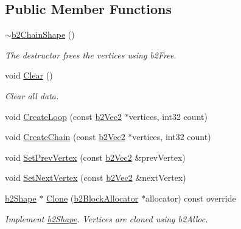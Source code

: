 \subsection*{Public Member Functions}
\begin{DoxyCompactItemize}
\item 
\mbox{\label{classb2_chain_shape_a8c032394f5a85e7fc425a437e7689a18}} 
\hyperlink{classb2_chain_shape_a8c032394f5a85e7fc425a437e7689a18}{$\sim$b2\+Chain\+Shape} ()
\begin{DoxyCompactList}\small\item\em The destructor frees the vertices using b2\+Free. \end{DoxyCompactList}\item 
\mbox{\label{classb2_chain_shape_a434d4b61ab15726302ec5ad484011c33}} 
void \hyperlink{classb2_chain_shape_a434d4b61ab15726302ec5ad484011c33}{Clear} ()
\begin{DoxyCompactList}\small\item\em Clear all data. \end{DoxyCompactList}\item 
void \hyperlink{classb2_chain_shape_ac257742a52cac391e25962a4c703fb06}{Create\+Loop} (const \hyperlink{structb2_vec2}{b2\+Vec2} $\ast$vertices, int32 count)
\item 
void \hyperlink{classb2_chain_shape_aa0977339b743c05f2179939ccc38e7e0}{Create\+Chain} (const \hyperlink{structb2_vec2}{b2\+Vec2} $\ast$vertices, int32 count)
\item 
void \hyperlink{classb2_chain_shape_aeb2ddbe0c52a98885e91b7c8f597315b}{Set\+Prev\+Vertex} (const \hyperlink{structb2_vec2}{b2\+Vec2} \&prev\+Vertex)
\item 
void \hyperlink{classb2_chain_shape_a15c7c2821a52266ef57621ac7d34a95f}{Set\+Next\+Vertex} (const \hyperlink{structb2_vec2}{b2\+Vec2} \&next\+Vertex)
\item 
\mbox{\label{classb2_chain_shape_a03d2ea80168d29c553fa21b5a821e6d8}} 
\hyperlink{classb2_shape}{b2\+Shape} $\ast$ \hyperlink{classb2_chain_shape_a03d2ea80168d29c553fa21b5a821e6d8}{Clone} (\hyperlink{classb2_block_allocator}{b2\+Block\+Allocator} $\ast$allocator) const override
\begin{DoxyCompactList}\small\item\em Implement \hyperlink{classb2_shape}{b2\+Shape}. Vertices are cloned using b2\+Alloc. \end{DoxyCompactList}\item 

\end{DoxyCompactItemize}
